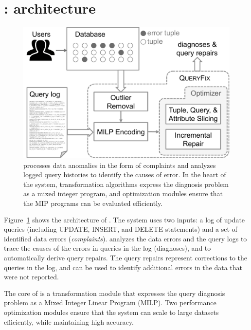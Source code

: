 \section{{\large\textbf{\sys}}: architecture}


\begin{figure}[t]
    \centering
        \includegraphics[scale=0.35]{figures/architecture}
    \caption{\sys processes data anomalies in the form of complaints and analyzes logged query histories to identify the causes of error. In the heart of the system, transformation algorithms express the diagnosis problem as a mixed integer program, and optimization modules ensure that the MIP programs can be evaluated efficiently.}
    \label{fig:architecture}
\end{figure}

Figure~\ref{fig:architecture} shows the architecture of \sys. The system uses
two inputs: a log of update queries (including UPDATE, INSERT, and DELETE
statements) and a set of identified data errors (\emph{complaints}). \sys
analyzes the data errors and the query logs to trace the causes of the errors
in queries in the log (diagnoses), and to automatically derive query repairs.
The query repairs represent corrections to the queries in the log, and can be
used to identify additional errors in the data that were not reported.

The core of \sys is a transformation module that expresses the query diagnosis
problem as a Mixed Integer Linear Program (MILP). Two performance optimization modules
ensure that the system can scale to large datasets efficiently, while
maintaining high accuracy. 



